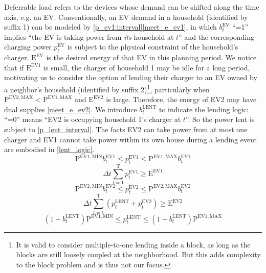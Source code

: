 \documentclass[journal]{IEEEtran}
\begin{document}
\par
Deferrable load refers to the devices whose demand can be shifted along the
time axis, e.g. an EV.
Conventionally, an EV demand in a household (identified by suffix 1) can be modeled 
by \eqref{p_ev1:interval}\eqref{meet_e_ev1}, in which $b^\mathrm{EV}_t$ ``=1''
implies ``the EV is taking power from \textit{its} household at $t$'' and the corresponding
charging power $p_t^\mathrm{EV}$ is subject to the physical constraint of
the household's charger. $\mathrm{E}^\mathrm{EV}$ is the desired energy of 
that EV in this planning period.
We notice that if $\mathrm{E}^\mathrm{EV1}$ is small, the charger of
household 1 may be idle for a long period, motivating us to consider
the option of lending their charger to an EV owned by a neighbor's
household (identified by suffix 2)\footnote{It is valid to consider multiple-to-one lending inside a block, as long as the blocks are still loosely coupled at the neighborhood. But this adds complexity to the block problem and is thus not our focus.}, particularly when
$\mathrm{P}^\mathrm{EV2, MAX} < \mathrm{P}^\mathrm{EV1, MAX}$
and $\mathrm{E}^\mathrm{EV2}$ is large.
Therefore, the energy of EV2 may have dual supplies \eqref{meet_e_ev2}.
We introduce $b_t^\mathrm{LENT}$ to indicate the lending logic:
``=0'' means ``EV2 is occupying household 1's charger at $t$''.
So the power lent is subject to \eqref{p_lent_interval}.
The facts EV2 can take power from at most one charger and
EV1 cannot take power within its own house during a lending event
are embodied in \eqref{lent_logic}.
\begin{equation}\label{p_ev1:interval}
    \mathrm{P}^\mathrm{EV1, MIN} b^\mathrm{EV1}_t \le p_t^\mathrm{EV1} \le \mathrm{P}^\mathrm{EV1, MAX} b^\mathrm{EV1}_t
\end{equation}
\begin{equation}\label{meet_e_ev1}
    \Delta t \sum_{t=1}^\mathrm{T} p_t^\mathrm{EV1} \ge \mathrm{E}^\mathrm{EV1}
\end{equation}
\begin{equation}\label{p_ev2:interval}
    \mathrm{P}^\mathrm{EV2, MIN} b^\mathrm{EV2}_t \le p_t^\mathrm{EV2} \le \mathrm{P}^\mathrm{EV2, MAX} b^\mathrm{EV2}_t
\end{equation}
\begin{equation}\label{meet_e_ev2}
    \Delta t \sum_{t=1}^\mathrm{T} (p_t^\mathrm{LENT} + p_t^\mathrm{EV2}) \ge \mathrm{E}^\mathrm{EV2}
\end{equation}
\begin{equation}\label{p_lent_interval}
    (1-b_t^\mathrm{LENT}) \mathrm{P}^\mathrm{EV1, MIN} \le p_t^\mathrm{LENT} \le (1-b_t^\mathrm{LENT}) \mathrm{P}^\mathrm{EV1, MAX}
\end{equation}
\end{document}
